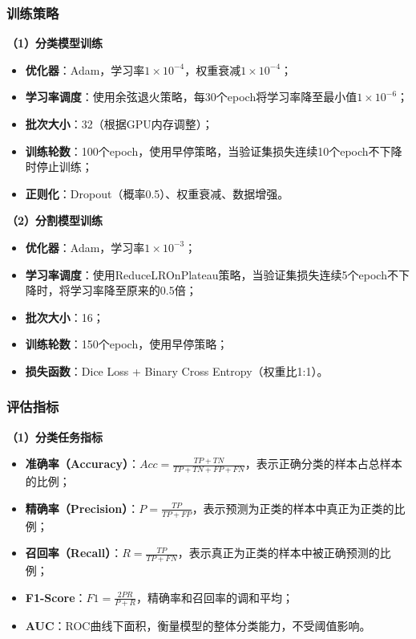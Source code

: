 \documentclass[supercite]{Hust-undergraduate-kaiti}
\theoremstyle{definition}
\begin{document}
\subsubsection{训练策略}

\textbf{（1）分类模型训练}

\begin{itemize}
    \item \textbf{优化器}：Adam，学习率$1\times10^{-4}$，权重衰减$1\times10^{-4}$；
    \item \textbf{学习率调度}：使用余弦退火策略，每30个epoch将学习率降至最小值$1\times10^{-6}$；
    \item \textbf{批次大小}：32（根据GPU内存调整）；
    \item \textbf{训练轮数}：100个epoch，使用早停策略，当验证集损失连续10个epoch不下降时停止训练；
    \item \textbf{正则化}：Dropout（概率0.5）、权重衰减、数据增强。
\end{itemize}

\textbf{（2）分割模型训练}

\begin{itemize}
    \item \textbf{优化器}：Adam，学习率$1\times10^{-3}$；
    \item \textbf{学习率调度}：使用ReduceLROnPlateau策略，当验证集损失连续5个epoch不下降时，将学习率降至原来的0.5倍；
    \item \textbf{批次大小}：16；
    \item \textbf{训练轮数}：150个epoch，使用早停策略；
    \item \textbf{损失函数}：Dice Loss + Binary Cross Entropy（权重比1:1）。
\end{itemize}

\subsubsection{评估指标}

\textbf{（1）分类任务指标}

\begin{itemize}
    \item \textbf{准确率（Accuracy）}：$Acc = \frac{TP + TN}{TP + TN + FP + FN}$，表示正确分类的样本占总样本的比例；
    \item \textbf{精确率（Precision）}：$P = \frac{TP}{TP + FP}$，表示预测为正类的样本中真正为正类的比例；
    \item \textbf{召回率（Recall）}：$R = \frac{TP}{TP + FN}$，表示真正为正类的样本中被正确预测的比例；
    \item \textbf{F1-Score}：$F1 = \frac{2PR}{P + R}$，精确率和召回率的调和平均；
    \item \textbf{AUC}：ROC曲线下面积，衡量模型的整体分类能力，不受阈值影响。
\end{itemize}
\end{document}
